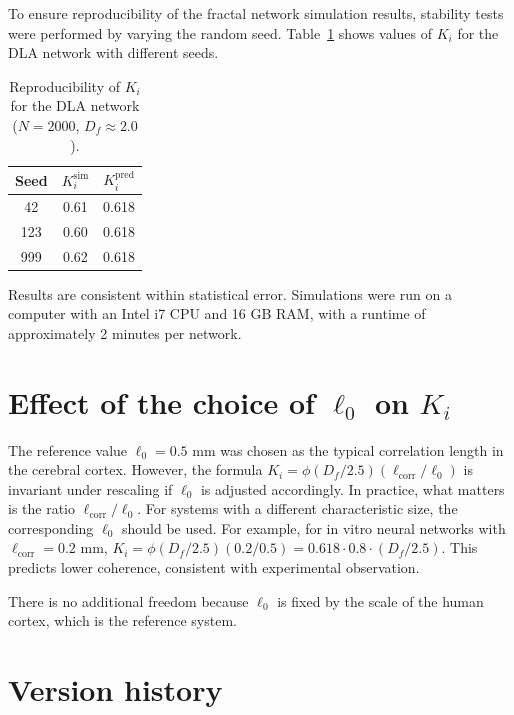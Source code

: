 \documentclass[12pt, a4paper]{article}
\theoremstyle{miuThm}
\theoremstyle{remark}
\begin{document}
To ensure reproducibility of the fractal network simulation results, stability tests were performed by varying the random seed. Table~\ref{tab:validacion} shows values of $K_i$ for the DLA network with different seeds.

\begin{table}[h!]
\centering
\caption{Reproducibility of $K_i$ for the DLA network ($N=2000$, $D_f\approx2.0$).}
\label{tab:validacion}
\begin{tabular}{ccc}
\toprule
\textbf{Seed} & $K_i^{\text{sim}}$ & $K_i^{\text{pred}}$ \\
\midrule
42 & 0.61 & 0.618 \\
123 & 0.60 & 0.618 \\
999 & 0.62 & 0.618 \\
\bottomrule
\end{tabular}
\end{table}

Results are consistent within statistical error. Simulations were run on a computer with an Intel i7 CPU and 16 GB RAM, with a runtime of approximately 2 minutes per network.

\clearpage
\section{Effect of the choice of $\ell_0$ on $K_i$}

The reference value $\ell_0 = 0.5$ mm was chosen as the typical correlation length in the cerebral cortex. However, the formula $K_i = \phi (D_f/2.5)(\ell_{\text{corr}}/\ell_0)$ is invariant under rescaling if $\ell_0$ is adjusted accordingly. In practice, what matters is the ratio $\ell_{\text{corr}}/\ell_0$. For systems with a different characteristic size, the corresponding $\ell_0$ should be used. For example, for in vitro neural networks with $\ell_{\text{corr}} = 0.2$ mm, $K_i = \phi (D_f/2.5)(0.2/0.5) = 0.618 \cdot 0.8 \cdot (D_f/2.5)$. This predicts lower coherence, consistent with experimental observation.

There is no additional freedom because $\ell_0$ is fixed by the scale of the human cortex, which is the reference system.

\clearpage
\section{Version history}
\end{document}
